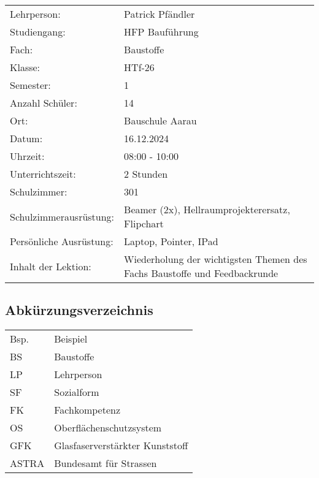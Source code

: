 \documentclass[
11pt,
captions=tableheading,
headsepline,
footsepline, 
captions=tableheading,
parskip=half-,
]{scrartcl}
\begin{document}
\begin{table}[ht]
    \centering
    \label{tab:uebersicht}
    \begin{tabularx}{\textwidth}{@{}Xp{11cm}@{}}
    \toprule
    Lehrperson: & Patrick Pfändler \\
    Studiengang: & HFP Bauführung \\
    Fach: & Baustoffe \\
    \midrule
    Klasse: & HTf-26 \\
    Semester: & 1 \\
    Anzahl Schüler: & 14 \\
    Ort: & Bauschule Aarau \\
    Datum: & 16.12.2024 \\
    Uhrzeit: & 08:00 - 10:00 \\
    Unterrichtszeit: & 2 Stunden \\
    Schulzimmer: & 301 \\
    Schulzimmerausrüstung: & Beamer (2x), Hellraumprojekterersatz, Flipchart \\
    \midrule
    Persönliche Ausrüstung: & Laptop, Pointer, IPad \\
    \midrule
    Inhalt der Lektion: & Wiederholung der wichtigsten Themen des Fachs Baustoffe und Feedbackrunde \\
    \bottomrule
    \end{tabularx}
    \end{table}



\clearpage
\vspace*{2cm}
\setcounter{tocdepth}{3} %
\tableofcontents%
\clearpage

\subsection*{Abkürzungsverzeichnis}
\begin{table}[H]
    \centering
    \label{tab:abkuerzungen}
    \begin{tabularx}{\textwidth}{@{}ll@{}}
    \toprule
    Bsp. & Beispiel \\
    BS & Baustoffe \\
    LP & Lehrperson \\
    SF & Sozialform \\
    FK & Fachkompetenz \\
    OS & Oberflächenschutzsystem \\
    GFK & Glasfaserverstärkter Kunststoff \\
    ASTRA & Bundesamt für Strassen \\
    \bottomrule
    \end{tabularx}
    \end{table}
\end{document}
